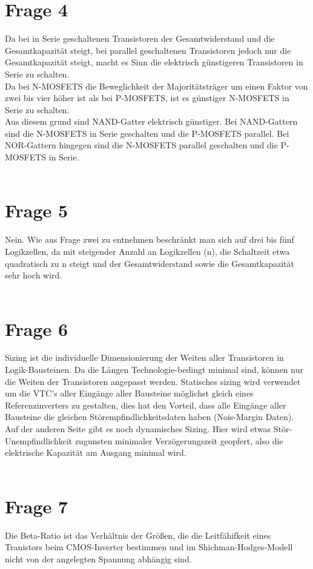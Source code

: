 \documentclass[a4paper]{scrartcl}
\begin{document}
\section*{Frage 4}
Da bei in Serie geschaltenen Transistoren der Gesamtwiderstand und die Gesamtkapazität steigt, bei parallel geschaltenen Transistoren jedoch nur die Gesamtkapazität steigt, macht es Sinn die elektrisch günstigeren Transistoren in Serie zu schalten.\\
Da bei N-MOSFETS die Beweglichkeit der Majoritätsträger um einen Faktor von zwei bis vier höher ist als bei P-MOSFETS, ist es günstiger N-MOSFETS in Serie zu schalten.\\
Aus diesem grund sind NAND-Gatter elektrisch günstiger. Bei NAND-Gattern sind die N-MOSFETS in Serie geschalten und die P-MOSFETS parallel. Bei NOR-Gattern hingegen sind die N-MOSFETS parallel geschalten und die P-MOSFETS in Serie.
~\\
~\\
\section*{Frage 5}
Nein. Wie aus Frage zwei zu entnehmen beschränkt man sich auf drei bis fünf Logikzellen, da mit steigender Anzahl an Logikzellen (n), die Schaltzeit etwa quadratisch zu n steigt und der Gesamtwiderstand sowie die Gesamtkapazität sehr hoch wird.
~\\
~\\
\section*{Frage 6}
Sizing ist die individuelle Dimensionierung der Weiten aller Transistoren in Logik-Bausteinen. Da die Längen Technologie-bedingt minimal sind, können nur die Weiten der Transistoren angepasst werden. Statisches sizing wird verwendet um die VTC's aller Eingänge aller Bausteine möglichst gleich eines Referenzinverters zu gestalten, dies hat den Vorteil, dass alle Eingänge aller Bausteine die gleichen Störempfindlichkeitsdaten haben (Nois-Margin Daten).\\
Auf der anderen Seite gibt es noch dynamisches Sizing. Hier wird etwas Stör-Unempfindlichkeit zugunsten minimaler Verzögerungszeit geopfert, also die elektrische Kapazität am Ausgang minimal wird.
~\\
~\\
\section*{Frage 7}
Die Beta-Ratio ist das Verhältnis der Größen, die die Leitfähifkeit eines Tranistors beim CMOS-Inverter bestimmen und im Shichman-Hodges-Modell nicht von der angelegten Spannung abhängig sind.
~\\
~\\
\end{document}
